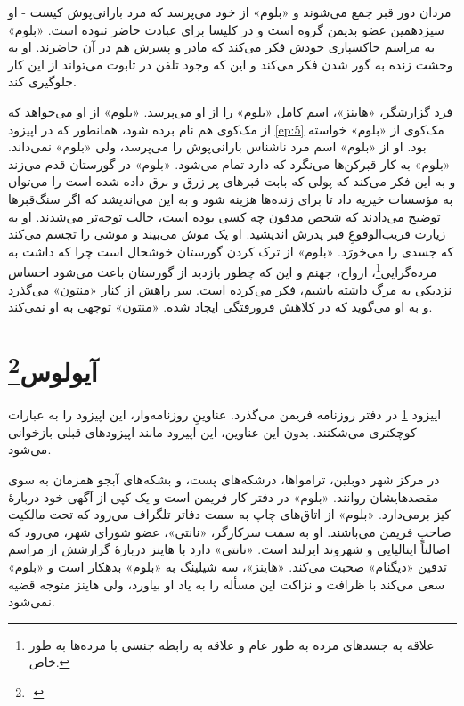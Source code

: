 \documentclass[12pt]{book}
\newcommand{\noun}[1]{«{#1}»}
\begin{document}
    مردان دور قبر جمع می‌شوند و \noun{بلوم} از خود می‌پرسد که مرد بارانی‌پوش کیست - او سیزدهمین عضو بدیمن گروه است و در کلیسا برای عبادت حاضر نبوده است. \noun{بلوم} به مراسم خاکسپاری خودش فکر می‌کند که مادر و پسرش هم در آن حاضرند. او به وحشت زنده به گور شدن فکر می‌کند و این که وجود تلفن در تابوت می‌تواند از این کار جلوگیری کند.

    فرد گزارشگر، \noun{هاینز}، اسم کامل \noun{بلوم} را از او می‌پرسد. \noun{بلوم} از او می‌خواهد که از مک‌کوی هم نام برده شود، همانطور که در اپیزود \ref{ep:5} مک‌کوی از \noun{بلوم} خواسته بود. او از \noun{بلوم} اسم مرد ناشناس بارانی‌پوش را می‌پرسد، ولی \noun{بلوم} نمی‌داند. \noun{بلوم} به کار قبرکن‌ها می‌نگرد که دارد تمام می‌شود. \noun{بلوم} در گورستان قدم می‌زند و به این فکر می‌کند که پولی که بابت قبرهای پر زرق و برق داده شده است را می‌توان به مؤسسات خیریه داد تا برای زنده‌ها هزینه شود و به این می‌اندیشد که اگر سنگ‌قبرها توضیح می‌دادند که شخص مدفون چه کسی بوده است، جالب توجه‌تر می‌شدند. او به زیارت قریب‌الوقوعِ قبر پدرش اندیشید. او یک موش می‌بیند و موشی را تجسم می‌کند که جسدی را می‌خورَد. \noun{بلوم} از ترک کردن گورستان خوشحال است چرا که داشت به مرده‌گرایی\footnote{علاقه به جسدهای مرده به طور عام و علاقه به رابطه جنسی با مرده‌ها به طور خاص.}، ارواح، جهنم و این که چطور بازدید از گورستان باعث می‌شود احساس نزدیکی به مرگ داشته باشیم، فکر می‌کرده است. سر راهش از کنار \noun{منتون} می‌گذرد و به او می‌گوید که در کلاهش فرورفتگی ایجاد شده. \noun{منتون} توجهی به او نمی‌کند.

    \chapter[آیولوس]{آیولوس\protect\footnote{-}}\label{ep:7}
    اپیزود \ref{ep:7} در دفتر روزنامه فریمن می‌گذرد. عناوینِ روزنامه‌وار، این اپیزود را به عبارات کوچکتری می‌شکنند. بدون این عناوین، این اپیزود مانند اپیزودهای قبلی بازخوانی می‌شود.

    در مرکز شهر دوبلین، ترامواها، درشکه‌های پست، و بشکه‌های آبجو همزمان به سوی مقصدهایشان روانند. \noun{بلوم} در دفتر کار فریمن است و یک کپی از آگهی خود دربارۀ کیز برمی‌دارد. \noun{بلوم} از اتاق‌های چاپ به سمت دفاتر تلگراف می‌رود که تحت مالکیت صاحبِ فریمن می‌باشند. او به سمت سرکارگر، \noun{نانتی}، عضو شورای شهر، می‌رود که اصالتاً ایتالیایی و شهروند ایرلند است. \noun{نانتی} دارد با هاینز دربارۀ گزارشش از مراسم تدفین \noun{دیگنام} صحبت می‌کند. \noun{هاینز}، سه شیلینگ به \noun{بلوم} بدهکار است و \noun{بلوم} سعی می‌کند با ظرافت و نزاکت این مسأله را به یاد او بیاورد، ولی هاینز متوجه قضیه نمی‌شود.
\end{document}
